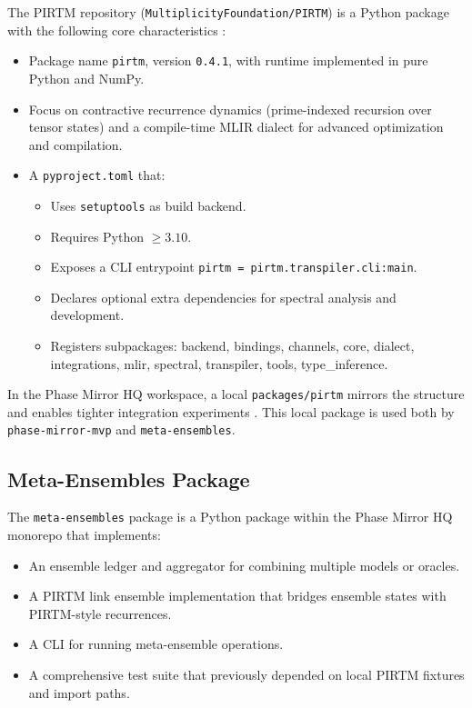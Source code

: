 \documentclass[11pt]{article}
\begin{document}
The PIRTM repository (\texttt{MultiplicityFoundation/PIRTM}) is a Python package with the following core characteristics \cite{pirtm-pyproject}:
\begin{itemize}
  \item Package name \texttt{pirtm}, version \texttt{0.4.1}, with runtime implemented in pure Python and NumPy.
  \item Focus on contractive recurrence dynamics (prime-indexed recursion over tensor states) and a compile-time MLIR dialect for advanced optimization and compilation.
  \item A \texttt{pyproject.toml} that:
    \begin{itemize}
      \item Uses \texttt{setuptools} as build backend.
      \item Requires Python $\geq 3.10$.
      \item Exposes a CLI entrypoint \texttt{pirtm = pirtm.transpiler.cli:main}.
      \item Declares optional extra dependencies for spectral analysis and development.
      \item Registers subpackages: backend, bindings, channels, core, dialect, integrations, mlir, spectral, transpiler, tools, type\_inference.
    \end{itemize}
\end{itemize}

In the Phase Mirror HQ workspace, a local \texttt{packages/pirtm} mirrors the structure and enables tighter integration experiments \cite{hq-pirtm-local}. This local package is used both by \texttt{phase-mirror-mvp} and \texttt{meta-ensembles}.

\subsection{Meta-Ensembles Package}

The \texttt{meta-ensembles} package is a Python package within the Phase Mirror HQ monorepo that implements:
\begin{itemize}
  \item An ensemble ledger and aggregator for combining multiple models or oracles.
  \item A PIRTM link ensemble implementation that bridges ensemble states with PIRTM-style recurrences.
  \item A CLI for running meta-ensemble operations.
  \item A comprehensive test suite that previously depended on local PIRTM fixtures and import paths.
\end{itemize}
\end{document}
